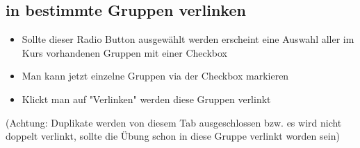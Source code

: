 \subsection*{in bestimmte Gruppen verlinken}
\begin{itemize}
	\item Sollte dieser Radio Button ausgewählt werden erscheint eine Auswahl aller im Kurs vorhandenen Gruppen mit einer Checkbox
	\item Man kann jetzt einzelne Gruppen via der Checkbox markieren
	\item Klickt man auf "Verlinken" werden diese Gruppen verlinkt
\end{itemize}

(Achtung: Duplikate werden von diesem Tab ausgeschlossen bzw. es wird nicht doppelt verlinkt, sollte die Übung schon in diese Gruppe verlinkt worden sein) 
\clearpage